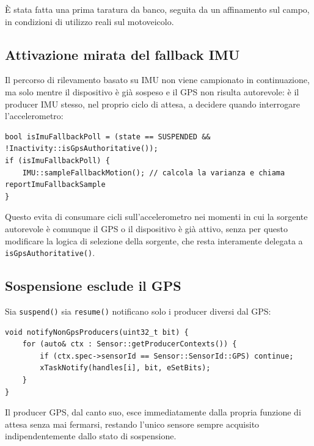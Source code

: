 È stata fatta una prima taratura da banco, seguita da un affinamento sul campo, in condizioni di utilizzo 
reali sul motoveicolo. \\

\subsection{Attivazione mirata del fallback IMU}
Il percorso di rilevamento basato su IMU non viene campionato in
continuazione, ma solo mentre il dispositivo è già sospeso e il GPS non
risulta autorevole: è il producer IMU stesso, nel proprio ciclo di attesa, a
decidere quando interrogare l'accelerometro:

\begin{listing}[H]
\begin{verbatim}
bool isImuFallbackPoll = (state == SUSPENDED && !Inactivity::isGpsAuthoritative());
if (isImuFallbackPoll) {
    IMU::sampleFallbackMotion(); // calcola la varianza e chiama reportImuFallbackSample
}
\end{verbatim}
\caption{Campionamento mirato del fallback IMU nel producer}
\label{listing:imu-fallback-poll}
\end{listing}

Questo evita di consumare cicli sull'accelerometro nei momenti in cui la
sorgente autorevole è comunque il GPS o il dispositivo è già attivo, senza
per questo modificare la logica di selezione della sorgente, che resta
interamente delegata a \texttt{isGpsAuthoritative()}.

\subsection{Sospensione esclude il GPS}
Sia \texttt{suspend()} sia \texttt{resume()} notificano solo i producer
diversi dal GPS:

\begin{listing}[H]
\begin{verbatim}
void notifyNonGpsProducers(uint32_t bit) {
    for (auto& ctx : Sensor::getProducerContexts()) {
        if (ctx.spec->sensorId == Sensor::SensorId::GPS) continue;
        xTaskNotify(handles[i], bit, eSetBits);
    }
}
\end{verbatim}
\caption{Propagazione della sospensione a tutti i producer tranne il GPS}
\label{listing:notify-non-gps}
\end{listing}

Il producer GPS, dal canto suo, esce immediatamente dalla propria funzione di
attesa senza mai fermarsi, restando l'unico sensore sempre acquisito
indipendentemente dallo stato di sospensione.

